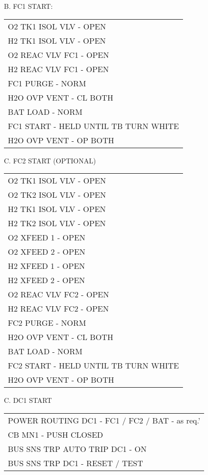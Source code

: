 \documentclass[Orbiter User Manual.tex]{subfiles}
\begin{document}
\noindent
B. FC1 START:
	\begin{longtable}{ p{\textwidth} }
	O2 TK1 ISOL VLV - OPEN\\
	H2 TK1 ISOL VLV - OPEN\\
	O2 REAC VLV FC1 - OPEN\\
	H2 REAC VLV FC1 - OPEN\\
	FC1 PURGE - NORM\\
	H2O OVP VENT - CL BOTH\\
	BAT LOAD - NORM\\
	FC1 START - HELD UNTIL TB TURN WHITE\\
	H2O OVP VENT - OP BOTH
	\end{longtable}

\noindent
C. FC2 START (OPTIONAL)
	\begin{longtable}{ p{\textwidth} }
	O2 TK1 ISOL VLV - OPEN\\
	O2 TK2 ISOL VLV - OPEN\\
	H2 TK1 ISOL VLV - OPEN\\
	H2 TK2 ISOL VLV - OPEN\\
	O2 XFEED 1 - OPEN\\
	O2 XFEED 2 - OPEN\\
	H2 XFEED 1 - OPEN\\
	H2 XFEED 2 - OPEN\\
	O2 REAC VLV FC2 - OPEN\\
	H2 REAC VLV FC2 - OPEN\\
	FC2 PURGE - NORM\\
	H2O OVP VENT - CL BOTH\\
	BAT LOAD - NORM\\
	FC2 START - HELD UNTIL TB TURN WHITE\\
	H2O OVP VENT - OP BOTH
	\end{longtable}

\noindent
C. DC1 START
	\begin{longtable}{ p{\textwidth} }
	POWER ROUTING DC1 - FC1 / FC2 / BAT - as req.'\\
	CB MN1 - PUSH CLOSED\\
	BUS SNS TRP AUTO TRIP DC1 - ON\\
	BUS SNS TRP DC1 - RESET / TEST
	\end{longtable}
\end{document}
